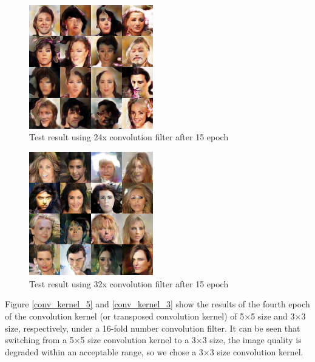 \begin{figure}
    \begin{center}
    \includegraphics[width=0.48\textwidth]{figures/result_conv_filter_24.png}
    \caption{Test result using 24x convolution filter after 15 epoch}
    \label{conv_filter_24}
    \end{center}
\end{figure}

\begin{figure}
    \begin{center}
    \includegraphics[width=0.48\textwidth]{figures/result_conv_filter_32.png}
    \caption{Test result using 32x convolution filter after 15 epoch}
    \label{conv_filter_32}
    \end{center}
\end{figure}

Figure \ref{conv_kernel_5} and \ref{conv_kernel_3} show the results of the fourth epoch of the convolution kernel (or transposed convolution kernel) of 5×5 size and 3×3 size,
    respectively, under a 16-fold number convolution filter.
It can be seen that switching from a 5×5 size convolution kernel to a 3×3 size,
    the image quality is degraded within an acceptable range, so we chose a 3×3 size convolution kernel.

